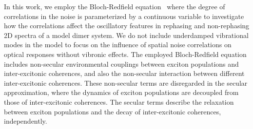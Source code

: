 \documentclass[%
 reprint,%
 amssymb, amsmath,%
 aip,cha,%
]{revtex4-1}
\begin{document}
In this work, we employ the Bloch-Redfield equation~\cite{JeskePRA2013,JeskeJCP2015} where the degree of correlations in the noise is parameterized by a continuous variable to investigate how the correlations affect the oscillatory features in rephasing and non-rephasing 2D spectra of a model dimer system. We do not include underdamped vibrational modes in the model to focus on the influence of spatial noise correlations on optical responses without vibronic effects. The employed Bloch-Redfield equation includes non-secular environmental couplings between exciton populations and inter-excitonic coherences, and also the non-secular interaction between different inter-excitonic coherences. These non-secular terms are disregarded in the secular approximation, where the dynamics of exciton populations are decoupled from those of inter-excitonic coherences.  The secular terms describe the relaxation between exciton populations and the decay of inter-excitonic coherences, independently.
\end{document}
